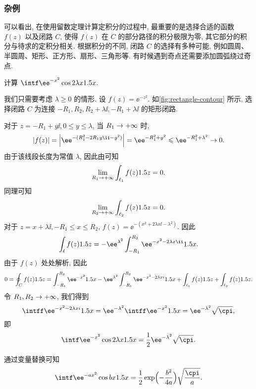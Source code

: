 \subsubsection{杂例\optional}

可以看出, 在使用留数定理计算定积分的过程中, 最重要的是选择合适的函数 $f(z)$ 以及闭路 $C$, 使得 $f(z)$ 在 $C$ 的部分路径的积分极限为零, 其它部分的积分与待求的定积分相关.
根据积分的不同, 闭路 $C$ 的选择有多种可能, 例如圆周、半圆周、矩形、正方形、扇形、三角形等.
有时候遇到奇点还需要添加圆弧绕过奇点.

\begin{example}
  计算 $\intf\ee^{-x^2}\cos{2\lambda x}\d x$.
\end{example}

\begin{solution}
  我们只需要考虑 $\lambda \ge 0$ 的情形.
  设 $f(z)=\ee^{-z^2}$.
  如\ref{fig:rectangle-contour} 所示, 选择闭路 $C$ 为连接 $-R_1,R_2,R_2+\lambda \ii,-R_1+\lambda \ii$ 的矩形闭路.

  对于 $z=-R_1+y\ii,0\le y\le \lambda$, 当 $R_1\rightarrow+\infty$ 时,
  \[
    |f(z)|=\abs{\ee^{-(R_1^2-2R_1y\ii-y^2)}}
    =\ee^{-R_1^2+y^2}\le \ee^{-R_1^2+\lambda^2}\ra0.
  \]
  由于该线段长度为常值 $\lambda$, 因此由\thmGrowUp 可知
  \[
    \lim_{R_1\rightarrow+\infty}\int_{\ell_1}f(z)1.5 z=0.
  \]
  同理可知
  \[
    \lim_{R_2\rightarrow+\infty}\int_{\ell_2}f(z)1.5 z=0.
  \]
  对于 $z=x+\lambda \ii,-R_1\le x\le R_2$, $f(z)=\ee^{-(x^2+2\lambda x\ii-\lambda^2)}$.
  因此
  \[
    \int_\ell f(z)\d z
    =-\ee^{\lambda^2}\int_{-R_1}^{R_2} \ee^{-x^2-2\lambda x\ii}\d x.
  \]
  由于 $f(z)$ 处处解析, 因此
  \[
     0
    =\oint_C f(z)\d z
    =\int_{-R_1}^{R_2} \ee^{-x^2}\d x
    -\ee^{\lambda^2}\int_{-R_1}^{R_2} \ee^{-x^2-2\lambda xi}\d x
    +\int_{\ell_1}f(z)\d z
    +\int_{\ell_2}f(z)\d z.
  \]
  令 $R_1,R_2\rightarrow+\infty$, 我们得到
  \[
    \intff \ee^{-x^2-2\lambda xi}\d x
    =\ee^{-\lambda^2}\intff \ee^{-x^2}\d x
    =\ee^{-\lambda^2}\sqrt\cpi,
  \]
  即
  \[
    \intf \ee^{-x^2}\cos{2\lambda x}\d x
    =\frac12\ee^{-\lambda^2}\sqrt\cpi.
  \]
\end{solution}
通过变量替换可知
\begin{equation}\label{eq:exp-cos-integral}
  \intf \ee^{-ax^2}\cos{bx}\d x
  =\frac12\exp\Bigl(-\frac{b^2}{4a}\Bigr)\sqrt\frac\cpi a.
\end{equation}

